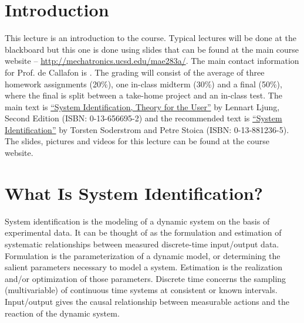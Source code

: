 \documentclass[lecture,12pt,]{pcms-l}
\begin{document}
\mainmatter
\setcounter{page}{1}

\lectureseries[\course]{\course}

\date{September 24, 2009}

\setaddress

\setcounter{lecture}{0}
\setcounter{chapter}{0}


\section{Introduction}
This lecture is an introduction to the course. Typical lectures will be done at the blackboard but this one is done using slides that can be found at the main course website -- \href{http://mechatronics.ucsd.edu/mae283a/}{http://mechatronics.ucsd.edu/mae283a/}. The main contact information for Prof. de Callafon is \mailto{\authEmail}{\authEmail}. The grading will consist of the average of three homework assignments (20\%), one in-class midterm (30\%) and a final (50\%), where the final is split between a take-home project and an in-class test. The main text is \href{http://www.amazon.com/s/ref=nb\_ss?url=search-alias\%3Daps\&field-keywords=0-13-656695-2&x=0\&y=0}{``System Identification, Theory for the User''} by Lennart Ljung, Second Edition (ISBN: 0-13-656695-2) and the recommended text is \href{http://www.amazon.com/s/ref=nb\_ss?url=search-alias\%3Daps\&field-keywords=0-13-881236-5&x=0\&y=0}{``System Identification''} by Torsten Soderstrom and Petre Stoica (ISBN: 0-13-881236-5). The slides, pictures and videos for this lecture can be found at the course website.

\section{What Is System Identification?}
System identification is the modeling of a dynamic system on the basis of experimental data. It can be thought of as the formulation and estimation of systematic relationships between measured discrete-time input/output data. Formulation is the parameterization of a dynamic model, or determining the salient parameters necessary to model a system. Estimation is the realization and/or optimization of those parameters. Discrete time concerns the sampling (multivariable) of continuous time systems at consistent or known intervals. Input/output gives the causal relationship between measurable actions and the reaction of the dynamic system.
\end{document}
